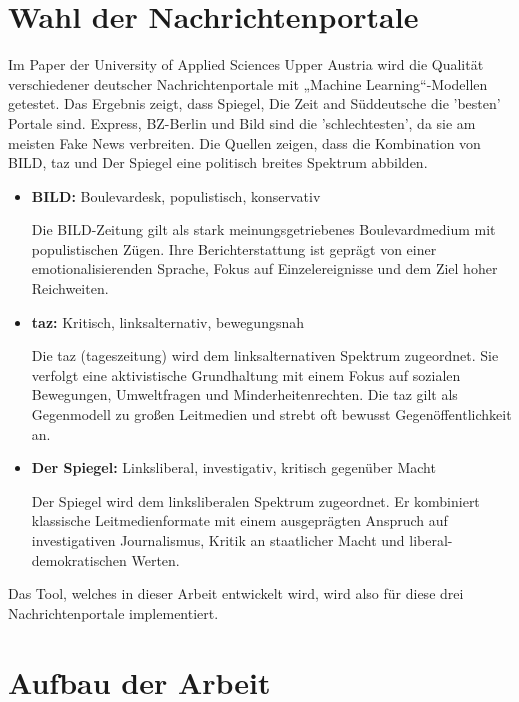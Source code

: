 \section{Wahl der Nachrichtenportale}
\label{sec:wahl_nachrichtenportale}

Im Paper der University of Applied Sciences Upper Austria \cite{Simone2022} wird die Qualität verschiedener deutscher Nachrichtenportale mit 
„Machine Learning“-Modellen getestet. 
Das Ergebnis zeigt, dass Spiegel, Die Zeit and Süddeutsche die 'besten' Portale sind. Express, BZ-Berlin und Bild sind die 'schlechtesten', da sie
am meisten Fake News verbreiten.
Die Quellen \cite{henke2024nachrichten, Lieb2023, Osing2022} zeigen, dass die Kombination von BILD, taz und Der Spiegel eine politisch 
breites Spektrum abbilden.

\begin{itemize}
    \item \textbf{BILD:} Boulevardesk, populistisch, konservativ
   
    Die BILD-Zeitung gilt als stark meinungsgetriebenes Boulevardmedium mit populistischen Zügen. Ihre Berichterstattung ist geprägt von einer emotionalisierenden Sprache, 
    Fokus auf Einzelereignisse und dem Ziel hoher Reichweiten.

    \item \textbf{taz:} Kritisch, linksalternativ, bewegungsnah
    
    Die taz (tageszeitung) wird dem linksalternativen Spektrum zugeordnet. Sie verfolgt eine aktivistische Grundhaltung mit einem Fokus auf 
    sozialen Bewegungen, Umweltfragen und Minderheitenrechten. 
    Die taz gilt als Gegenmodell zu großen Leitmedien und strebt oft bewusst Gegenöffentlichkeit an.

    \item \textbf{Der Spiegel:} Linksliberal, investigativ, kritisch gegenüber Macht
    
    Der Spiegel wird dem linksliberalen Spektrum zugeordnet. Er kombiniert klassische Leitmedienformate mit einem ausgeprägten Anspruch auf 
    investigativen Journalismus, Kritik an staatlicher Macht und liberal-demokratischen Werten.
\end{itemize}

Das Tool, welches in dieser Arbeit entwickelt wird, wird also für diese drei Nachrichtenportale implementiert.

\section{Aufbau der Arbeit}
\label{sec:aufbau}




